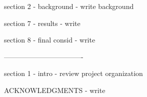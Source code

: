 section 2 - background
- write background

section 7 - results
- write

section 8 - final consid
- write

----------------------------------

section 1 - intro
- review project organization

ACKNOWLEDGMENTS
- write
